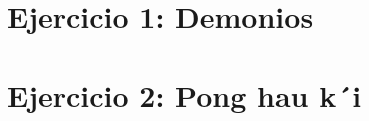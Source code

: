 \documentclass[spanish, a4paper, 10pt, titlepage]{article}
\author{Freijo - Giusto}
\begin{document}

\tableofcontents
\clearpage


\section{Ejercicio 1: Demonios}

\clearpage

\section{Ejercicio 2: Pong hau k\'\ i}
 
\clearpage
\end{document}

